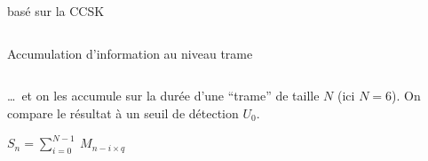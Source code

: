 \documentclass[../main.tex]{subfiles}
\begin{document}
\begin{frame}{\subsecname basé sur la CCSK}
  \begin{columns}
    \begin{column}{.6\linewidth}
    \end{column}
    \begin{column}{.4\linewidth}
      \centering
      \resizebox{\linewidth}{!}{
        
      }
    \end{column}
  \end{columns}
\end{frame}

\begin{frame}{Accumulation d'information au niveau trame}
  \begin{columns}
    \begin{column}{.5\linewidth}
      \dots~et on les accumule sur la durée d'une ``trame'' de taille $N$ (ici $N = 6$). On compare le résultat à un seuil de détection $U_0$.
      \begin{center}
        $S_n = \sum_{i = 0}^{N - 1}\:M_{n - i \times q}$

        \resizebox{.6\linewidth}{!}{
          
        }
      \end{center}
    \end{column}
    \begin{column}{.5\linewidth}
      \centering
      \resizebox{\linewidth}{!}{
        
      }
    \end{column}
  \end{columns}
\end{frame}
\end{document}
